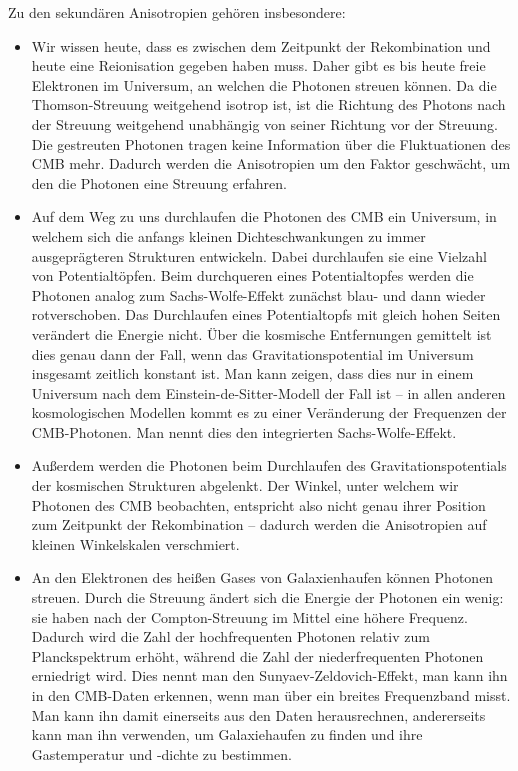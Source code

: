 \documentclass[10pt,a4paper]{article}
\begin{document}
Zu den sekundären Anisotropien gehören insbesondere:
\begin{itemize}
\item Wir wissen heute, dass es zwischen dem Zeitpunkt der Rekombination und heute eine Re\-ionisation gegeben haben muss. Daher gibt es bis heute freie Elektronen im Universum, an welchen die Photonen streuen können. Da die Thomson-Streuung weitgehend isotrop ist, ist die Richtung des Photons nach der Streuung weitgehend unabhängig von seiner Richtung vor der Streuung. Die gestreuten Photonen tragen keine Information über die Fluktuationen des CMB mehr. Dadurch werden die Anisotropien um den Faktor geschwächt, um den die Photonen eine Streuung erfahren.
\item Auf dem Weg zu uns durchlaufen die Photonen des CMB ein Universum, in welchem sich die anfangs kleinen Dichteschwankungen zu immer ausgeprägteren Strukturen entwickeln. Dabei durchlaufen sie eine Vielzahl von Potentialtöpfen. Beim durchqueren eines Potentialtopfes werden die Photonen analog zum Sachs-Wolfe-Effekt zunächst blau- und dann wieder rotverschoben. Das Durchlaufen eines Potentialtopfs mit gleich hohen Seiten verändert die Energie nicht. Über die kosmische Entfernungen gemittelt ist dies genau dann der Fall, wenn das Gravitationspotential im Universum insgesamt zeitlich konstant ist. Man kann zeigen, dass dies nur in einem Universum nach dem Einstein-de-Sitter-Modell der Fall ist -- in allen anderen kosmologischen Modellen kommt es zu einer Veränderung der Frequenzen der CMB-Photonen. Man nennt dies den integrierten Sachs-Wolfe-Effekt.\cite{Schneider}
\item Außerdem werden die Photonen beim Durchlaufen des Gravitationspotentials der kosmischen Strukturen abgelenkt. Der Winkel, unter welchem wir Photonen des CMB beobachten, entspricht also nicht genau ihrer Position zum Zeitpunkt der Rekombination -- dadurch werden die Anisotropien auf kleinen Winkelskalen verschmiert.\cite{Schneider}
\item An den Elektronen des heißen Gases von Galaxienhaufen können Photonen streuen. %
Durch die Streuung ändert sich die Energie der Photonen ein wenig: sie haben nach der Compton-Streuung im Mittel eine höhere Frequenz. Dadurch wird die Zahl der hochfrequenten Photonen relativ zum Planckspektrum erhöht, während die Zahl der niederfrequenten Photonen erniedrigt wird. Dies nennt man den Sunyaev-Zeldovich-Effekt, man kann ihn in den CMB-Daten erkennen, wenn man über ein breites Frequenzband misst. Man kann ihn damit einerseits aus den Daten herausrechnen, andererseits kann man ihn verwenden, um Galaxiehaufen zu finden und ihre Gastemperatur und -dichte zu bestimmen.\cite{Schneider}
\end{itemize}
\end{document}
